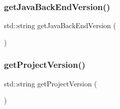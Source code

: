 \subsubsection{\texorpdfstring{get\+Java\+Back\+End\+Version()}{getJavaBackEndVersion()}}
{\footnotesize\ttfamily std\+::string get\+Java\+Back\+End\+Version (\begin{DoxyParamCaption}{ }\end{DoxyParamCaption})}

\mbox{\label{namespaceversion_a511c991ced04c44471064e36b90e6178}} 
\subsubsection{\texorpdfstring{get\+Project\+Version()}{getProjectVersion()}}
{\footnotesize\ttfamily std\+::string get\+Project\+Version (\begin{DoxyParamCaption}{ }\end{DoxyParamCaption})}

